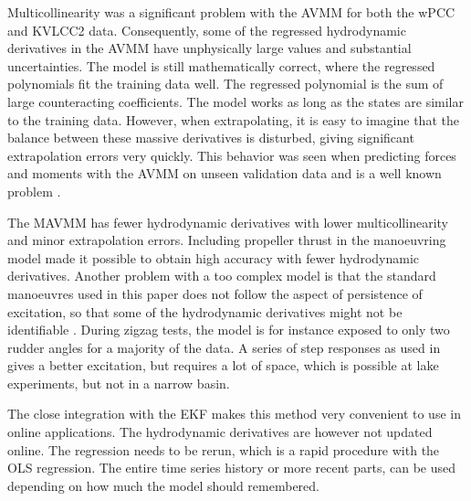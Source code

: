 \documentclass[review]{elsarticle}
\begin{document}
\sphinxAtStartPar
Multicollinearity was a significant problem with the AVMM for both the wPCC and KVLCC2 data. Consequently, some of the regressed hydrodynamic derivatives in the AVMM have unphysically large values and substantial uncertainties. The model is still mathematically correct, where the regressed polynomials fit the training data well.
The regressed polynomial is the sum of large counteracting coefficients. The model works as long as the states are similar to the training data. However, when extrapolating, it is easy to imagine that the balance between these massive derivatives is disturbed, giving significant extrapolation errors very quickly. This behavior was seen when predicting forces and moments with the AVMM on unseen validation data and is a well known problem \cite{ittc_maneuvering_2008}.

\sphinxAtStartPar
The MAVMM has fewer hydrodynamic derivatives with lower multicollinearity and minor extrapolation errors. Including propeller thrust in the manoeuvring model made it possible to obtain high accuracy with fewer hydrodynamic derivatives. Another problem with a too complex model is that the standard manoeuvres used in this paper does not follow the aspect of persistence of excitation, so that some of the hydrodynamic derivatives might not be identifiable \cite{revestido_herrero_two-step_2012}. During zigzag tests, the model is for instance exposed to only two rudder angles for a majority of the data. A series of step responses as used in \cite{miller_ship_2021} gives a better excitation, but requires a lot of space, which is possible at lake experiments, but not in a narrow basin.

\sphinxAtStartPar
The close integration with the EKF makes this method very convenient to use in online applications. The hydrodynamic derivatives are however not updated online. The regression needs to be rerun, which is a rapid procedure with the OLS regression.  The entire time series history or more recent parts, can be used depending on how much the model should remembered.
\end{document}
